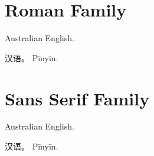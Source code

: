 \documentclass{article}
\begin{document}
\section{Roman Family}

Australian English.    

\foreignlanguage{chinese-simplified}{汉语。}
\foreignlanguage{pinyin}{Pīnyīn.}
\renewcommand*{\familydefault}{\sfdefault}
\sffamily

\section{Sans Serif Family}

Australian English.

\foreignlanguage{chinese-simplified}{汉语。}
\foreignlanguage{pinyin}{Pīnyīn.}
\end{document}
